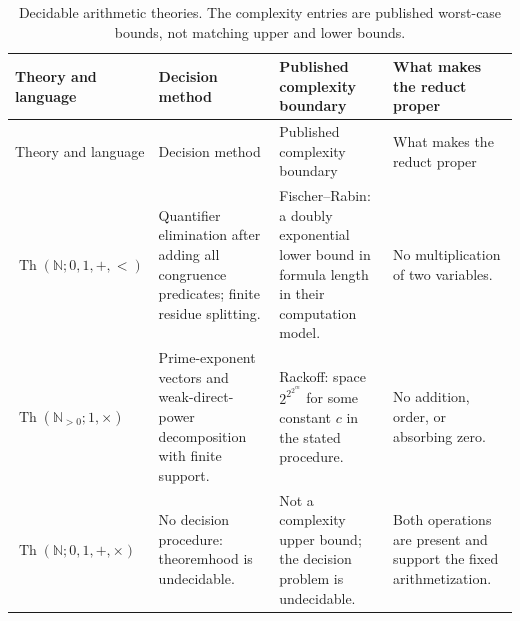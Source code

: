 \begingroup\small
\begin{longtable}{@{}p{}p{}p{}p{}@{}}
\caption{Decidable arithmetic theories.  The complexity
entries are published worst-case bounds, not matching upper and lower bounds.}
\label{tab:p05-decidable-arithmetics}\\
\toprule
Theory and language & Decision method & Published complexity boundary &
What makes the reduct proper \\
\midrule
\endfirsthead
\toprule
Theory and language & Decision method & Published complexity boundary &
What makes the reduct proper \\
\midrule
\endhead
\(\operatorname{Th}(\mathbb N;0,1,+,<)\) &
Quantifier elimination after adding all congruence predicates; finite residue
splitting. &
Fischer--Rabin: a doubly exponential lower bound in formula length in their
computation model. &
No multiplication of two variables. \\
\addlinespace
\(\operatorname{Th}(\mathbb N_{>0};1,\times)\) &
Prime-exponent vectors and weak-direct-power decomposition with finite support. &
Rackoff: space \(2^{2^{2^{cn}}}\) for some constant \(c\) in the stated
procedure. &
No addition, order, or absorbing zero. \\
\addlinespace
\(\operatorname{Th}(\mathbb N;0,1,+,\times)\) &
No decision procedure: theoremhood is undecidable. &
Not a complexity upper bound; the decision problem is undecidable. &
Both operations are present and support the fixed arithmetization. \\
\bottomrule
\end{longtable}
\endgroup
